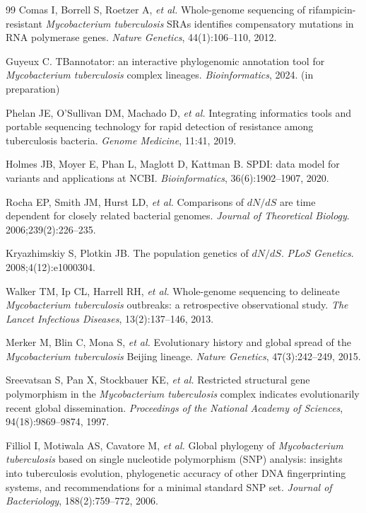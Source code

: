 \documentclass[11pt,a4paper]{article}
\begin{document}
\begin{thebibliography}{99}
	Comas I, Borrell S, Roetzer A, \textit{et al.}
	Whole-genome sequencing of rifampicin-resistant \textit{Mycobacterium
		tuberculosis} SRAs identifies compensatory mutations in RNA polymerase
	genes.
	\textit{Nature Genetics}, 44(1):106--110, 2012.


	Guyeux C.
	TBannotator: an interactive phylogenomic annotation tool for
	\textit{Mycobacterium tuberculosis} complex lineages.
	\textit{Bioinformatics}, 2024. (in preparation)

	Phelan JE, O'Sullivan DM, Machado D, \textit{et al.}
	Integrating informatics tools and portable sequencing technology for
	rapid detection of resistance among tuberculosis bacteria.
	\textit{Genome Medicine}, 11:41, 2019.


	Holmes JB, Moyer E, Phan L, Maglott D, Kattman B.
	SPDI: data model for variants and applications at NCBI.
	\textit{Bioinformatics}, 36(6):1902--1907, 2020.

	Rocha EP, Smith JM, Hurst LD, \textit{et al.}
	Comparisons of $dN/dS$ are time dependent for closely related bacterial genomes.
	\textit{Journal of Theoretical Biology}. 2006;239(2):226--235.

	Kryazhimskiy S, Plotkin JB.
	The population genetics of $dN/dS$.
	\textit{PLoS Genetics}. 2008;4(12):e1000304.

	Walker TM, Ip CL, Harrell RH, \textit{et al.}
	Whole-genome sequencing to delineate       \textit{Mycobacterium tuberculosis}
	outbreaks: a retrospective observational study.
	\textit{The Lancet Infectious Diseases}, 13(2):137--146, 2013.

	Merker M, Blin C, Mona S, \textit{et al.}
	Evolutionary history and global spread of the \textit{Mycobacterium
		tuberculosis} Beijing lineage.
	\textit{Nature Genetics}, 47(3):242--249, 2015.

	Sreevatsan S, Pan X, Stockbauer KE, \textit{et al.}
	Restricted structural gene polymorphism in the \textit{Mycobacterium
		tuberculosis} complex indicates evolutionarily recent global dissemination.
	\textit{Proceedings of the National Academy of Sciences}, 94(18):9869--9874, 1997.

	Filliol I, Motiwala AS, Cavatore M, \textit{et al.}
	Global phylogeny of \textit{Mycobacterium tuberculosis} based on single nucleotide
	polymorphism (SNP) analysis: insights into tuberculosis evolution, phylogenetic
	accuracy of other DNA fingerprinting systems, and recommendations for a minimal
	standard SNP set.
	\textit{Journal of Bacteriology}, 188(2):759--772, 2006.


\end{thebibliography}
\end{document}
